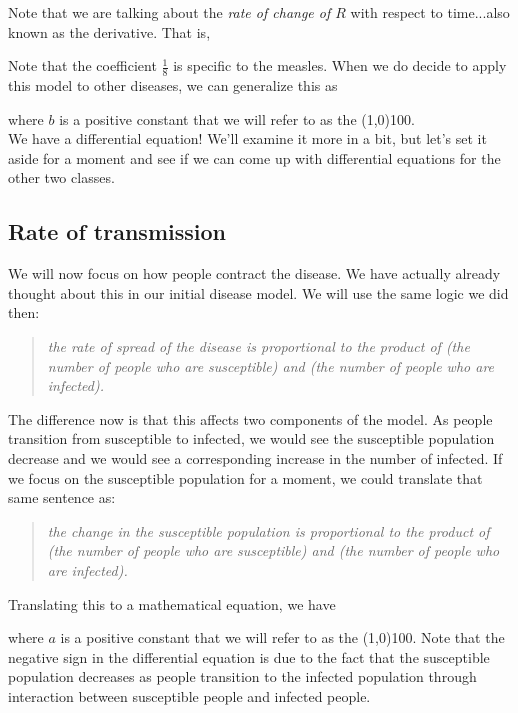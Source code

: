 \documentclass[12pt]{article}
\newcommand{\<}{\langle}
\renewcommand{\>}{\rangle}
\begin{document}
Note that we are talking about the {\it rate of change of $R$} with respect to time...also known as the
derivative.  That is,
\vspace{2cm}

	
\noindent  Note that the coefficient $\frac{1}{8}$ is specific to the measles.  When we do decide to
apply this model to other diseases, we can generalize this as 
\vspace{2cm}

\noindent where $b$ is a positive constant that we will refer to as the 
\line(1,0){100}.\\

\noindent  We have a differential equation!  We'll examine it more in a bit, but let's set it aside for a moment
and see if we can come up with differential equations for the other two classes.
\newpage
\subsection*{Rate of transmission}
\noindent  We will now focus on how people contract the disease.  We have actually already thought about
this in our initial disease model.  We will use the same logic we did then:
\begin{quote}{\it the rate of spread of the disease is proportional to the product of (the number of people 
who are susceptible) and (the number of people who are infected).}
\end{quote}
\noindent The difference now is that this affects two components of the model.  As people transition from
susceptible to infected, we would see the susceptible population decrease and we would see a 
corresponding increase in the number of infected.  If we focus on the susceptible population for a moment,
we could translate that same sentence as:
\begin{quote}{\it the change in the susceptible population is proportional to the product of (the number of people 
who are susceptible) and (the number of people who are infected).}
\end{quote}
Translating this to a mathematical equation, we have
\vspace{2cm}

\noindent where $a$ is a positive constant that we will refer to as the 
\line(1,0){100}.
Note that the negative 
sign in the differential equation is due to the fact that the susceptible population decreases as people
transition to the infected population through interaction between susceptible people and infected people.\\
\end{document}

